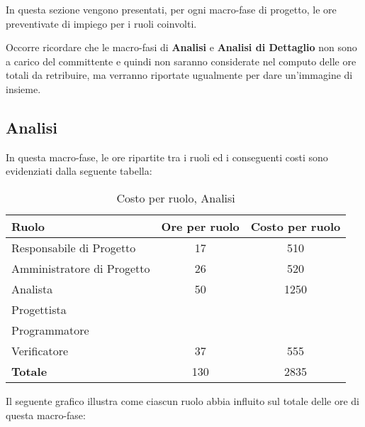 In questa sezione vengono presentati, per ogni macro-fase di progetto, le ore preventivate di impiego per i ruoli coinvolti.

\noindent Occorre ricordare che le macro-fasi di \textbf{Analisi} e \textbf{Analisi di Dettaglio} non sono a carico del committente e quindi non saranno considerate nel computo delle ore totali da retribuire, ma verranno riportate ugualmente per dare un'immagine di insieme.

\subsection{Analisi}
In questa macro-fase, le ore ripartite tra i ruoli ed i conseguenti costi sono evidenziati dalla seguente tabella:

\begin{table}[h]
\centering
\begin{tabular}{|l|c|c|}
	\toprule
	\textbf{Ruolo} & \textbf{Ore per ruolo} & \textbf{Costo per ruolo} \\
			
	\midrule
	Responsabile di Progetto & 17 & 510 \\
	Amministratore di Progetto & 26 & 520 \\ 
	Analista & 50 & 1250 \\
	Progettista & & \\
	Programmatore & & \\
	Verificatore & 37 & 555 \\
	\midrule
	\textbf{Totale} & 130 & 2835 \\
				
	\bottomrule
\end{tabular}
\caption{Costo per ruolo, Analisi}
\end{table}

\noindent Il seguente grafico illustra come ciascun ruolo abbia influito sul totale delle ore di questa macro-fase:

